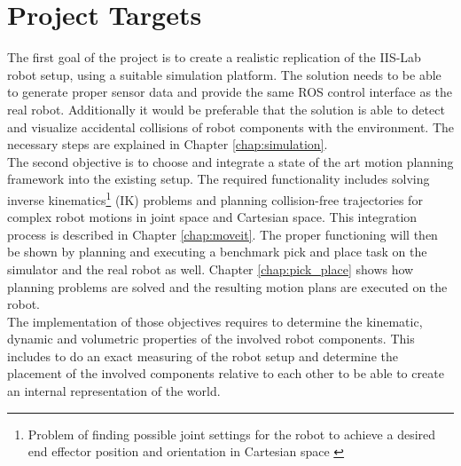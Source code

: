 \section{Project Targets}

The first goal of the project is to create a realistic replication of the IIS-Lab robot setup, using a suitable simulation platform. The solution needs to be able to generate proper sensor data and provide the same ROS control interface as the real robot. Additionally it would be preferable that the solution is able to detect and visualize accidental collisions of robot components with the environment. The necessary steps are explained in Chapter \ref{chap:simulation}.\\

The second objective is to choose and integrate a state of the art motion planning framework into the existing setup. The required functionality includes solving inverse kinematics\footnote{Problem of finding possible joint settings for the robot to achieve a desired end effector position and orientation in Cartesian space \citep{craig2005}} (IK) problems and planning collision-free trajectories for complex robot motions in joint space and Cartesian space. This integration process is described in Chapter \ref{chap:moveit}. The proper functioning will then be shown by planning and executing a benchmark pick and place task on the simulator and the real robot as well. Chapter \ref{chap:pick_place} shows how planning problems are solved and the resulting motion plans are executed on the robot.\\

The implementation of those objectives requires to determine the kinematic, dynamic and volumetric properties of the involved robot components. This includes to do an exact measuring of the robot setup and determine the placement of the involved components relative to each other to be able to create an internal representation of the world. 


